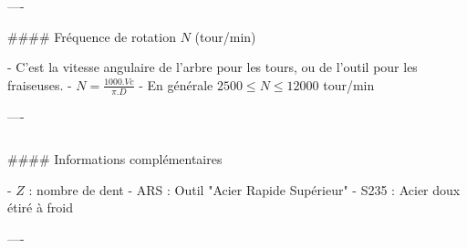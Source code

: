 \documentclass{beamer}
\begin{document}
\begin{frame}[fragile]
\begin{columns}[T]
\begin{column}{.46\textwidth}
\begin{markdown}
----

#### Fréquence de rotation $N$ (tour/min)

- C'est la vitesse angulaire de l'arbre pour les tours, ou de l'outil pour les fraiseuses.
- $N=\frac{1000.Vc}{\pi .D}$
- En générale $2500 \leq N \leq 12000$ tour/min

----


\end{markdown}
\end{column}
\end{columns}


\bigskip
{\hrulefill}
\bigskip

\begin{markdown}

#### Informations complémentaires

- $Z$ : nombre de dent
- ARS : Outil "Acier Rapide Supérieur"
- S235 : Acier doux étiré à froid

----

\end{markdown}

\end{frame}
\end{document}
